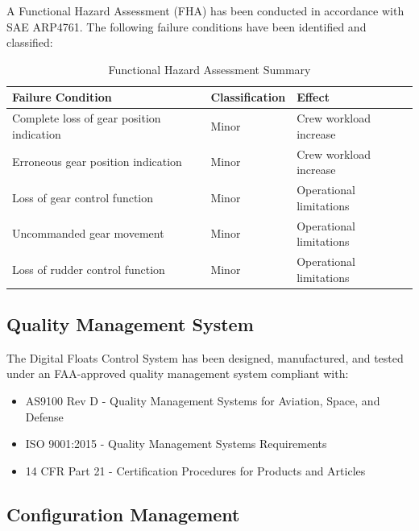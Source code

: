 \documentclass[12pt,a4paper,twoside,openright]{book}
\newcommand{\tabletextfont}{\normalfont\rmfamily}
\newcommand{\tableheadfont}{\normalfont\bfseries}
\begin{document}
A Functional Hazard Assessment (FHA) has been conducted in accordance with SAE ARP4761. The following failure conditions have been identified and classified:

\begin{table}[h]
\centering
\setlength{\tabcolsep}{5pt} %
\begin{tabular}{|p{}|p{}|p{}|}
\hline
\tableheadfont\textbf{Failure Condition} & \tableheadfont\textbf{Classification} & \tableheadfont\textbf{Effect} \\
\hline
\tabletextfont Complete loss of gear position indication & Minor & Crew workload increase \\
\hline
\tabletextfont Erroneous gear position indication & Minor & Crew workload increase \\
\hline
\tabletextfont Loss of gear control function & Minor & Operational limitations \\
\hline
\tabletextfont Uncommanded gear movement & Minor & Operational limitations \\
\hline
\tabletextfont Loss of rudder control function & Minor & Operational limitations \\
\hline
\end{tabular}
\caption{Functional Hazard Assessment Summary}
\end{table}

\subsection{Quality Management System}

The Digital Floats Control System has been designed, manufactured, and tested under an FAA-approved quality management system compliant with:

\begin{itemize}
    \item AS9100 Rev D - Quality Management Systems for Aviation, Space, and Defense
    \item ISO 9001:2015 - Quality Management Systems Requirements
    \item 14 CFR Part 21 - Certification Procedures for Products and Articles
\end{itemize}

\subsection{Configuration Management}
\end{document}
